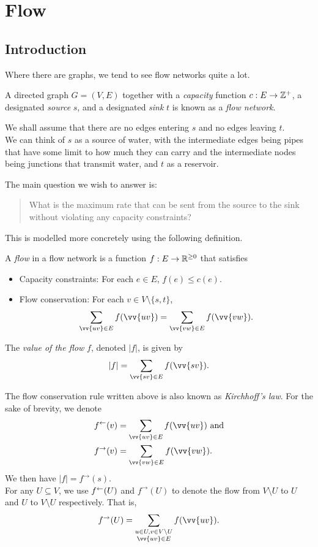 \section{Flow}

\subsection{Introduction}

	Where there are graphs, we tend to see flow networks quite a lot.

	\begin{fdef}
		A directed graph $G=(V,E)$ together with a \textit{capacity} function $c:E\to\mathbb{Z}^+$, a designated \textit{source} $s$, and a designated \textit{sink} $t$ is known as a \textit{flow network}.
	\end{fdef}

	We shall assume that there are no edges entering $s$ and no edges leaving $t$.\\
	We can think of $s$ as a source of water, with the intermediate edges being pipes that have some limit to how much they can carry and the intermediate nodes being junctions that transmit water, and $t$ as a reservoir.

	The main question we wish to answer is:
	\begin{quote}
		What is the maximum rate that can be sent from the source to the sink without violating any capacity constraints?
	\end{quote}

	This is modelled more concretely using the following definition.

	\begin{fdef}[Flow]
		A \textit{flow} in a flow network is a function $f:E\to\mathbb{R}^{\geq 0}$ that satisfies
		\begin{itemize}
			\item Capacity constraints: For each $e\in E$, $f(e)\leq c(e)$.
			\item Flow conservation: For each $v\in V\setminus\{s,t\}$,
			\[ \sum_{\vv{uv}\in E} f(\vv{uv}) = \sum_{\vv{vw}\in E} f(\vv{vw}). \]
		\end{itemize}
		The \textit{value of the flow} $f$, denoted $|f|$, is given by
		\[ |f| = \sum_{\vv{sv}\in E} f(\vv{sv}). \]
	\end{fdef}

	The flow conservation rule written above is also known as \textit{Kirchhoff's law}. For the sake of brevity, we denote
	\begin{align*}
		f^{\ot}(v) &= \sum_{\vv{uv}\in E} f(\vv{uv}) \text{ and} \\
		f^{\to}(v) &= \sum_{\vv{vw}\in E} f(\vv{vw}).
	\end{align*}
	We then have $|f|=f^{\to}(s)$.\\
	For any $U\subseteq V$, we use $f^{\leftarrow}(U)$ and $f^{\to}(U)$ to denote the flow from $V\setminus U$ to $U$ and $U$ to $V\setminus U$ respectively. That is,
	\[ f^\to(U) = \sum_{\substack{u\in U, v\in V\setminus U \\ \vv{uv}\in E}} f(\vv{uv}). \]

